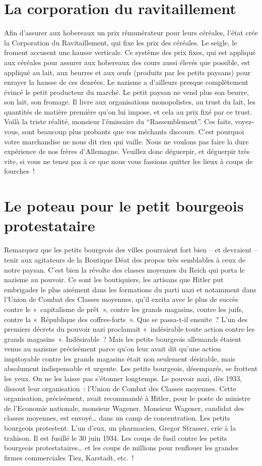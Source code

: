 \documentclass[french,twoside]{book} %
\begin{document}
\section[{La corporation du ravitaillement}]{La corporation du ravitaillement}
\noindent Afin d’assurer aux hobereaux un prix rémunérateur pour leurs céréales, l’état crée la Corporation du Ravitaillement, qui fixe les prix des céréales. Le seigle, le froment accusent une hausse verticale. Ce système des prix fixes, qui est appliqué aux céréales pour assurer aux hobereaux des cours aussi élevés que possible, est appliqué au lait, aux beurres et aux œufs (produits par les petits paysans) pour enrayer la hausse de ces denrées. Le nazisme a d’ailleurs presque complètement évincé le petit producteur du marché. Le petit paysan ne vend plus son beurre, son lait, son fromage. Il livre aux organisations monopolistes, au trust du lait, les quantités de matière première qu’on lui impose, et cela au prix fixé par ce trust. Voilà la triste réalité, monsieur l’émissaire du “Rassemblement”. Ces faits, voyez-vous, sont beaucoup plus probants que vos méchants discours. C’est pourquoi votre marchandise ne nous dit rien qui vaille. Nous ne voulons pas faire la dure expérience de nos frères d’Allemagne. Veuillez donc déguerpir, et déguerpir très vite, si vous ne tenez pas à ce que nous vous fassions quitter les lieux à coups de fourches !
\section[{Le poteau pour le petit bourgeois protestataire}]{Le poteau pour le petit bourgeois protestataire}
\noindent Remarquez que les petits bourgeois des villes pourraient fort bien – et devraient – tenir aux agitateurs de la Boutique Déat des propos très semblables à ceux de notre paysan. C’est bien la révolte des classes moyennes du Reich qui porta le nazisme au pouvoir. Ce sont les boutiquiers, les artisans que Hitler put embrigader le plus aisément dans les formations du parti nazi et notamment dans l’Union de Combat des Classes moyennes, qu’il excita avec le plus de succès contre le « capitalisme de prêt », contre les grands magasins, contre les juifs, contre la « République des coffres-forts ». Que se passa-t-il ensuite ? L’un des premiers décrets du pouvoir nazi proclamait « indésirable toute action contre les grands magasins ». Indésirable ? Mais les petits bourgeois allemands étaient venus au nazisme précisément parce qu’on leur avait dit qu’une action impitoyable contre les grands magasins était non seulement désirable, mais absolument indispensable et urgente. Les petits bourgeois, désemparés, se frottent les yeux. On ne les laisse pas s’étonner longtemps. Le pouvoir nazi, dès 1933, dissout leur organisation : l’Union de Combat des Classes moyennes. Cette organisation, précisément, avait recommandé à Hitler, pour le poste de ministre de l’Economie nationale, monsieur Wagener. Monsieur Wagener, candidat des classes moyennes, est envoyé… dans un camp de concentration. Les petits bourgeois protestent. L’un d’eux, un pharmacien, Gregor Strasser, crie à la trahison. Il est fusillé le 30 juin 1934. Les coups de fusil contre les petits bourgeois protestataires… et les coups de millions pour renflouer les grandes firmes commerciales Tiez, Karstadt, etc. !
\end{document}

